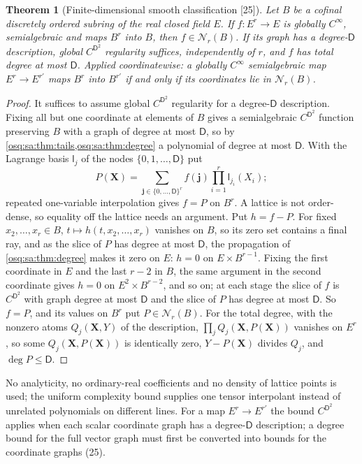 \documentclass[11pt,letterpaper]{article}
\numberwithin{equation}{section}
\newtheorem{theorem}{Theorem}[section]
\theoremstyle{definition}
\theoremstyle{remark}
\theoremstyle{plain}
\newcommand{\Num}{\mathscr N}
\newcommand{\src}[1]{\textup{\textsf{[#1]}}}
\begin{document}
\begin{theorem}[Finite-dimensional smooth classification \src{25}]\label{osq:sa:thm:smoothmany}
Let $B$ be a cofinal discretely ordered subring of the real closed field $E$. If $f:E^r\to E$ is globally $C^\infty$, semialgebraic and maps $B^r$ into
$B$, then $f\in\Num_r(B)$. If its graph has a degree-$\mathsf D$ description, global $C^{\mathsf D^2}$ regularity suffices, independently of $r$, and
$f$ has total degree at most $\mathsf D$. Applied coordinatewise: a globally $C^\infty$ semialgebraic map $E^r\to E^{r'}$ maps $B^r$ into $B^{r'}$ if and
only if its coordinates lie in $\Num_r(B)$.
\end{theorem}
\begin{proof}
It suffices to assume global $C^{\mathsf D^2}$ regularity for a degree-$\mathsf D$ description. Fixing all but one coordinate at elements of $B$ gives a
semialgebraic $C^{\mathsf D^2}$ function preserving $B$ with a graph of degree at most $\mathsf D$, so by \cref{osq:sa:thm:tails,osq:sa:thm:degree} a
polynomial of degree at most $\mathsf D$. With the Lagrange basis $\mathsf l_j$ of the nodes $\{0,1,\dots,\mathsf D\}$ put
\begin{equation}\label{osq:sa:eq:tensor}
 P(\mathbf X)=\sum_{\mathbf j\in\{0,\dots,\mathsf D\}^r}f(\mathbf j)\prod_{i=1}^r\mathsf l_{j_i}(X_i);
\end{equation}
repeated one-variable interpolation gives $f=P$ on $B^r$. A lattice is not order-dense, so equality off the lattice needs an argument. Put $h=f-P$. For
fixed $x_2,\dots,x_r\in B$, $t\mapsto h(t,x_2,\dots,x_r)$ vanishes on $B$, so its zero set contains a final ray, and as the slice of $P$ has degree at most
$\mathsf D$, the propagation of \cref{osq:sa:thm:degree} makes it zero on $E$: $h=0$ on $E\times B^{r-1}$. Fixing the first coordinate in $E$ and the last
$r-2$ in $B$, the same argument in the second coordinate gives $h=0$ on $E^2\times B^{r-2}$, and so on; at each stage the slice of $f$ is $C^{\mathsf D^2}$
with graph degree at most $\mathsf D$ and the slice of $P$ has degree at most $\mathsf D$. So $f=P$, and its values on $B^r$ put $P\in\Num_r(B)$. For the
total degree, with the nonzero atoms $Q_j(\mathbf X,Y)$ of the description, $\prod_jQ_j(\mathbf X,P(\mathbf X))$ vanishes on $E^r$, so some
$Q_j(\mathbf X,P(\mathbf X))$ is identically zero, $Y-P(\mathbf X)$ divides $Q_j$, and $\deg P\le\mathsf D$.
\end{proof}

No analyticity, no ordinary-real coefficients and no density of lattice points is used; the uniform complexity bound supplies one tensor interpolant
instead of unrelated polynomials on different lines. For a map $E^r\to E^{r'}$ the bound $C^{\mathsf D^2}$ applies when each scalar coordinate graph has a
degree-$\mathsf D$ description; a degree bound for the full vector graph must first be converted into bounds for the coordinate graphs (25).
\end{document}
